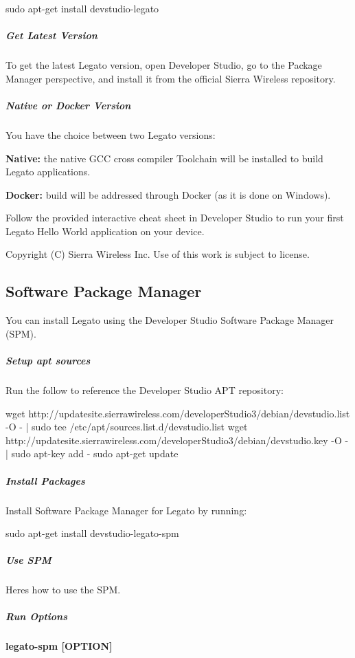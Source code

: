 \begin{DoxyVerb}sudo apt-get install devstudio-legato
\end{DoxyVerb}
\hypertarget{getstarted_d_slinux_i_d_e_getstartedDSlinuxIDE_latestVersion}{}\subparagraph{Get Latest Version}\label{getstarted_d_slinux_i_d_e_getstartedDSlinuxIDE_latestVersion}
To get the latest Legato version, open Developer Studio, go to the Package Manager perspective, and install it from the official Sierra Wireless repository.\hypertarget{getstarted_d_slinux_i_d_e_getstartedDSlinuxIDE_choice}{}\subparagraph{Native or Docker Version}\label{getstarted_d_slinux_i_d_e_getstartedDSlinuxIDE_choice}
You have the choice between two Legato versions\+:


\begin{DoxyItemize}
\item {\bfseries Native\+:} the native G\+C\+C cross compiler Toolchain will be installed to build Legato applications.
\item {\bfseries Docker\+:} build will be addressed through Docker (as it is done on Windows).
\end{DoxyItemize}

Follow the provided interactive cheat sheet in Developer Studio to run your first Legato Hello World application on your device.





Copyright (C) Sierra Wireless Inc. Use of this work is subject to license. \hypertarget{getstartedDSspm}{}\subsection{Software Package Manager}\label{getstartedDSspm}
You can install Legato using the Developer Studio Software Package Manager (S\+P\+M).\hypertarget{getstarted_d_sspm_getstartedDSspm_installSPMapt}{}\subparagraph{Setup apt sources}\label{getstarted_d_sspm_getstartedDSspm_installSPMapt}
Run the follow to reference the Developer Studio A\+P\+T repository\+:


\begin{DoxyCode}
wget http:\textcolor{comment}{//updatesite.sierrawireless.com/developerStudio3/debian/devstudio.list -O - | sudo tee
       /etc/apt/sources.list.d/devstudio.list}
wget http:\textcolor{comment}{//updatesite.sierrawireless.com/developerStudio3/debian/devstudio.key -O - | sudo apt-key add -}
sudo apt-\textcolor{keyword}{get} update
\end{DoxyCode}
\hypertarget{getstarted_d_sspm_getstartedDSspm_installSPM}{}\subparagraph{Install Packages}\label{getstarted_d_sspm_getstartedDSspm_installSPM}
Install Software Package Manager for Legato by running\+: \begin{DoxyVerb}sudo apt-get install devstudio-legato-spm
\end{DoxyVerb}
\hypertarget{getstarted_d_sspm_getstartedDSspm_useSPM}{}\subparagraph{Use S\+P\+M}\label{getstarted_d_sspm_getstartedDSspm_useSPM}
Here\textquotesingle{}s how to use the S\+P\+M.\hypertarget{getstarted_d_sspm_getstartedComLine_useSPMoptions}{}\subparagraph{Run Options}\label{getstarted_d_sspm_getstartedComLine_useSPMoptions}
{\bfseries {\ttfamily legato-\/spm \mbox{[}O\+P\+T\+I\+O\+N\mbox{]}}}

